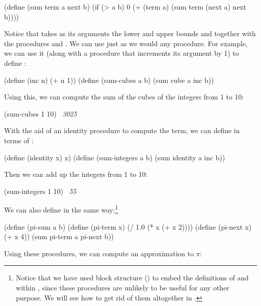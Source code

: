 \begin{codeBlock}
(define (sum term a next b)
  (if (> a b)
      0
      (+ (term a)
         (sum term (next a) next b))))
\end{codeBlock}

\noindent
Notice that  takes as its arguments the lower and upper bounds
 and  together with the procedures  and .
We can use  just as we would any procedure.  For example, we can use
it (along with a procedure  that increments its argument by 1) to
define :

\begin{codeBlock}
(define (inc n) (+ n 1))
(define (sum-cubes a b)
  (sum cube a inc b))
\end{codeBlock}

\noindent
Using this, we can compute the sum of the cubes of the integers from 1 to 10:

\begin{codeBlock}
(sum-cubes 1 10)
~\textit{3025}~
\end{codeBlock}

\noindent
With the aid of an identity procedure to compute the term, we can define
 in terms of :

\begin{codeBlock}
(define (identity x) x)
(define (sum-integers a b)
  (sum identity a inc b))
\end{codeBlock}

\noindent
Then we can add up the integers from 1 to 10:

\begin{codeBlock}
(sum-integers 1 10)
~\textit{55}~
\end{codeBlock}

\noindent
We can also define  in the same way:\footnote{Notice that we have
used block structure () to embed the definitions of
 and  within , since these procedures
are unlikely to be useful for any other purpose.  We will see how to get rid of
them altogether in .}

\begin{codeBlock}
(define (pi-sum a b)
  (define (pi-term x)
    (/ 1.0 (* x (+ x 2))))
  (define (pi-next x)
    (+ x 4))
  (sum pi-term a pi-next b))
\end{codeBlock}

\noindent
Using these procedures, we can compute an approximation to \( \pi \):

